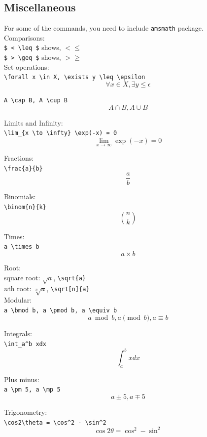 \documentclass{article}
\begin{document}
\subsection{Miscellaneous}

For some of the commands, you need to include \verb|amsmath| package.\\

Comparisons:\\
\verb|$ < \leq $| shows, $ < \leq $\\
\verb|$ > \geq $| shows, $ > \geq $\\

Set operations:\\
\verb|\forall x \in X, \exists y \leq \epsilon|\\
$$ \forall x \in X, \exists y \leq \epsilon $$

\verb|A \cap B, A \cup B|\\
$$ A \cap B, A \cup B $$

Limits and Infinity:\\
\verb|\lim_{x \to \infty} \exp(-x) = 0|\\
$$ \lim_{x \to \infty} \exp(-x) = 0 $$

Fractions:\\
\verb|\frac{a}{b}|\\
$$ \frac{a}{b} $$

Binomials:\\
\verb|\binom{n}{k}|\\
$$ \binom{n}{k} $$

Times:\\
\verb|a \times b|\\
$$ a \times b $$

Root:\\
square root: $ \sqrt{a} $, \verb|\sqrt{a}|\\
$n$th root: $ \sqrt[n]{a} $, \verb|\sqrt[n]{a}|\\

Modular:\\
\verb|a \bmod b, a \pmod b, a \equiv b|\\
$$ a \bmod b, a \pmod b, a \equiv b $$

Integrals:\\
\verb|\int_a^b xdx|\\
$$ \int_a^b xdx $$

Plus minus:\\
\verb|a \pm 5, a \mp 5|\\
$$ a \pm 5, a \mp 5 $$

Trigonometry:\\
\verb|\cos2\theta = \cos^2 - \sin^2|\\
$$\cos2\theta = \cos^2 - \sin^2$$
\end{document}
